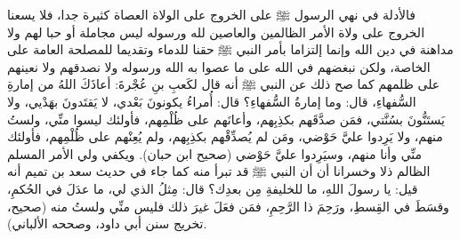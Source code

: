 فالأدلة في نهي الرسول ﷺ على الخروج على الولاة العصاة كثيرة جدا، فلا يسعنا الخروج على ولاة الأمر الظالمين والعاصين لله ورسوله ليس مجاملة أو حبا لهم ولا مداهنة في دين الله وإنما إلتزاما بأمر النبي ﷺ حقنا للدماء وتقديما للمصلحة العامة على الخاصة، ولكن نبغضهم في الله على ما عصوا به الله ورسوله ولا نصدقهم ولا نعينهم على ظلمهم كما صح ذلك عن النبي ﷺ أنه قال لكَعبِ بنِ عُجْرةَ: أعاذَكَ اللهُ من إمارةِ السُّفهاءِ، قال: وما إمارةُ السُّفهاءِ؟ قال: أُمراءُ يكونونَ بَعْدي، لا يَقتَدونَ بهَدْيي، ولا يَستَنُّونَ بسُنَّتي، فمَن صدَّقَهم بكذِبِهم، وأعانَهم على ظُلْمِهم، فأولئك ليسوا منِّي، ولستُ منهم، ولا يَرِدوا عليَّ حَوْضي، ومَن لم يُصدِّقْهم بكذِبِهم، ولم يُعِنْهم على ظُلْمِهم، فأولئك منِّي وأنا منهم، وسيَرِدوا عليَّ حَوْضي {\footnotesize (صحيح ابن حبان)}. ويكفي ولي الأمر المسلم الظالم ذلا وخسرانا أن أن النبي ﷺ قد تبرأ منه كما جاء في حديث سعد بن تميم أنه قيل: يا رسولَ اللهِ، ما للخليفةِ مِن بعدِك؟ قال: مِثلُ الذي لي، ما عدَلَ في الحُكمِ، وقسَطَ في القِسطِ، ورَحِمَ ذا الرَّحِمِ، فمَن فعَلَ غيرَ ذلك فليس منِّي ولستُ منه {\footnotesize (صحيح، تخريج سنن أبي داود، وصححه الألباني)}.


